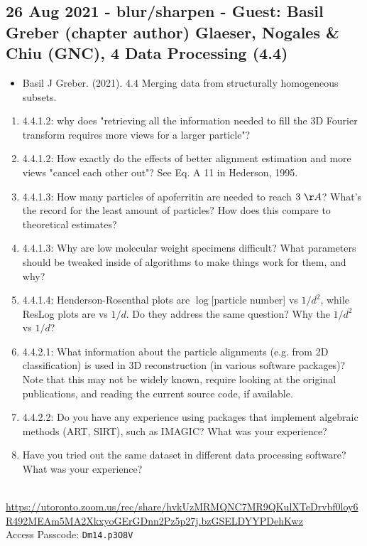 \documentclass[11pt, oneside]{article}   	%
\begin{document}
\subsection{26 Aug 2021 - blur/sharpen - Guest: Basil Greber (chapter author) Glaeser, Nogales \& Chiu (GNC), 4 Data Processing (4.4)}
\begin{itemize}
	\item Basil J Greber. (2021). 4.4 Merging data from structurally homogeneous subsets.
\end{itemize}
\begin{enumerate}
	\item 4.4.1.2: why does "retrieving all the information needed to fill the 3D Fourier transform requires more views for a larger particle"?
	\item 4.4.1.2: How exactly do the effects of better alignment estimation and more views "cancel each other out"? See Eq. A 11 in Hederson, 1995. %
	\item 4.4.1.3: How many particles of apoferritin are needed to reach $3 \ \AA$? What's the record for the least amount of particles? How does this compare to theoretical estimates?
	\item 4.4.1.3: Why are low molecular weight specimens difficult? What parameters should be tweaked inside of algorithms to make things work for them, and why?
	\item 4.4.1.4: Henderson-Rosenthal plots are $\log$[particle number] vs $1/d^2$, while ResLog plots are vs $1/d$. Do they address the same question? Why the $1/d^2$ vs $1/d$?
	\item 4.4.2.1: What information about the particle alignments (e.g. from 2D classification) is used in 3D reconstruction (in various software packages)? Note that this may not be widely known, require looking at the original publications, and reading the current source code, if available.
	\item 4.4.2.2: Do you have any experience using packages that implement algebraic methods (ART, SIRT), such as IMAGIC? What was your experience?
	\item Have you tried out the same dataset in different data processing software? What was your experience?
\end{enumerate}
 \\
{\tiny \url{https://utoronto.zoom.us/rec/share/hvkUzMRMQNC7MR9QKulXTeDrvbf0loy6R492MEAm5MA2XkxyoGErGDnn2Pz5p27j.bzGSELDYYPDehKwz}} \\
Access Passcode: \texttt{Dm14.p3O8V}
\end{document}
